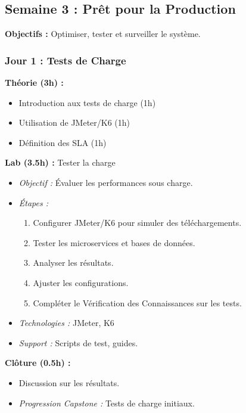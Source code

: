 \documentclass[11pt]{article}
\begin{document}
\subsection{Semaine 3 : Prêt pour la Production}
\textbf{Objectifs :} Optimiser, tester et surveiller le système.

\subsubsection{Jour 1 : Tests de Charge}
\textbf{Théorie (3h) :}
\begin{itemize}
    \item Introduction aux tests de charge (1h)
    \item Utilisation de JMeter/K6 (1h)
    \item Définition des SLA (1h)
\end{itemize}
\textbf{Lab (3.5h) :} Tester la charge
\begin{itemize}
    \item \textit{Objectif :} Évaluer les performances sous charge.
    \item \textit{Étapes :}
        \begin{enumerate}
            \item Configurer JMeter/K6 pour simuler des téléchargements.
            \item Tester les microservices et bases de données.
            \item Analyser les résultats.
            \item Ajuster les configurations.
            \item Compléter le Vérification des Connaissances sur les tests.
        \end{enumerate}
    \item \textit{Technologies :} JMeter, K6
    \item \textit{Support :} Scripts de test, guides.
\end{itemize}
\textbf{Clôture (0.5h) :}
\begin{itemize}
    \item Discussion sur les résultats.
    \item \textit{Progression Capstone :} Tests de charge initiaux.
\end{itemize}
\end{document}
